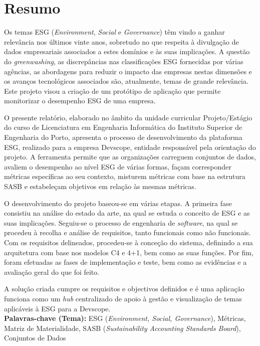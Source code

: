 \chapter*{\textbf{Resumo}}


Os temas ESG (\textit{Environment}, \textit{Social} e \textit{Governance}) têm vindo a ganhar relevância nos últimos vinte anos, sobretudo no que respeita à divulgação de dados empresariais associados a estes domínios e às suas implicações. A questão do \textit{greenwashing}, as discrepâncias nas classificações ESG fornecidas por várias agências, as abordagens para reduzir o impacto das empresas nestas dimensões e os avanços tecnológicos associados são, atualmente, temas de grande relevância. Este projeto visou a criação de um protótipo de aplicação que permite monitorizar o desempenho ESG de uma empresa.

O presente relatório, elaborado no âmbito da unidade curricular Projeto/Estágio do curso de Licenciatura em Engenharia Informática do Instituto Superior de Engenharia do Porto, apresenta o processo de desenvolvimento da plataforma ESG, realizado para a empresa Devscope, entidade responsável pela orientação do projeto. A ferramenta permite que as organizações carreguem conjuntos de dados, avaliem o desempenho ao nível ESG de várias formas, façam corresponder métricas específicas ao seu contexto, misturem métricas com base na estrutura SASB e estabeleçam objetivos em relação às mesmas métricas.

O desenvolvimento do projeto baseou-se em várias etapas. A primeira fase consistiu na análise do estado da arte, na qual se estuda o conceito de ESG e as suas implicações. Seguiu-se o processo de engenharia de \textit{software}, na qual se procedeu à recolha e análise de requisitos, tanto funcionais como não funcionais. Com os requisitos delineados, procedeu-se à conceção do sistema, definindo a sua arquitetura com base nos modelos C4 e 4+1, bem como as suas funções. Por fim, foram efetuadas as fases de implementação e teste, bem como as evidências e a avaliação geral do que foi feito.

A solução criada cumpre os requisitos e objectivos definidos e é uma aplicação funciona como um \textit{hub} centralizado de apoio à gestão e visualização de temas aplicáveis à ESG para a Devscope. \\

\textbf{Palavras-chave (Tema):}	ESG (\textit{Environment, Social, Governance}), Métricas, Matriz de Materialidade, SASB (\textit{Sustainability Accounting Standards Board}), Conjuntos de Dados \\


